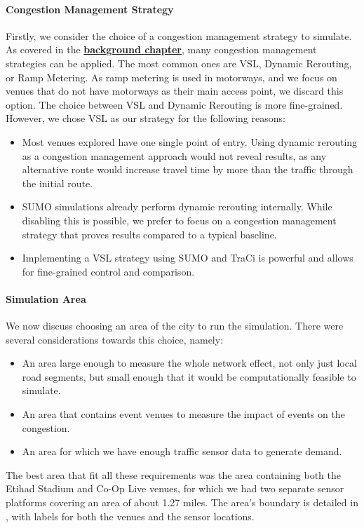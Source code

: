 \paragraph{Congestion Management Strategy}
Firstly, we consider the choice of a congestion management strategy to simulate. As covered in the \textbf{\hyperref[link:cmt]{background chapter}}, many congestion management strategies can be applied. The most common ones are VSL, Dynamic Rerouting, or Ramp Metering. As ramp metering is used in motorways, and we focus on venues that do not have motorways as their main access point, we discard this option. The choice between VSL and Dynamic Rerouting is more fine-grained. However, we chose VSL as our strategy for the following reasons:
\begin{itemize}
    \item Most venues explored have one single point of entry. Using dynamic rerouting as a congestion management approach would not reveal results, as any alternative route would increase travel time by more than the traffic through the initial route.
    \item SUMO simulations already perform dynamic rerouting internally. While disabling this is possible, we prefer to focus on a congestion management strategy that proves results compared to a typical baseline.
    \item Implementing a VSL strategy using SUMO and TraCi is powerful and allows for fine-grained control and comparison.
\end{itemize}

\paragraph{Simulation Area}
We now discuss choosing an area of the city to run the simulation. There were several considerations towards this choice, namely:
\begin{itemize}
    \item An area large enough to measure the whole network effect, not only just local road segments, but small enough that it would be computationally feasible to simulate.
    \item An area that contains event venues to measure the impact of events on the congestion.
    \item An area for which we have enough traffic sensor data to generate demand.
\end{itemize}

The best area that fit all these requirements was the area containing both the Etihad Stadium and Co-Op Live venues, for which we had two separate sensor platforms covering an area of about 1.27 miles. The area's boundary is detailed in , with labels for both the venues and the sensor locations.

